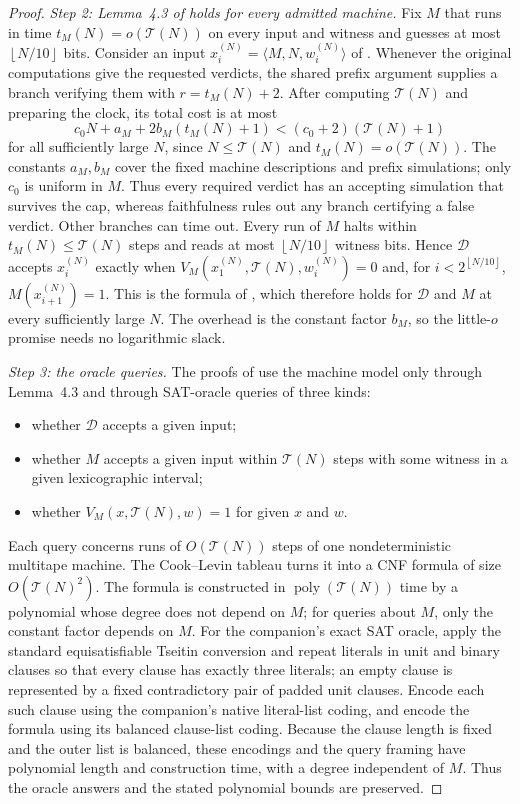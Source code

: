\documentclass[11pt,letterpaper]{article}
\theoremstyle{definition}
\theoremstyle{remark}
\newcommand{\poly}{\operatorname{poly}}
\newcommand{\floor}[1]{\left\lfloor #1\right\rfloor}
\newcommand{\Tclk}{\mathcal T}
\begin{document}
\begin{proof}
\emph{Step 2: Lemma~4.3 of \cite{CLW20} holds for every admitted machine.}
Fix \(M\) that runs in time \(t_M(N)=o(\Tclk(N))\) on every input and
witness and guesses at most \(\floor{N/10}\) bits. Consider an input
\(x^{(N)}_i=\langle M,N,w^{(N)}_i\rangle\) of \cite[Section~4.2]{CLW20}.
Whenever the original computations give the requested verdicts, the
shared prefix argument supplies a branch verifying them with
\(r=t_M(N)+2\). After computing \(\Tclk(N)\) and preparing the
clock, its total cost is at most
\[
 c_0N+a_M+2b_M(t_M(N)+1)
 <(c_0+2)(\Tclk(N)+1)
\]
for all sufficiently large \(N\), since \(N\le\Tclk(N)\) and
\(t_M(N)=o(\Tclk(N))\). The constants \(a_M,b_M\) cover the fixed
machine descriptions and prefix simulations; only \(c_0\) is uniform
in \(M\). Thus every required verdict has an accepting simulation
that survives the cap, whereas faithfulness rules out any branch
certifying a false verdict. Other branches can time out. Every
run of \(M\) halts within \(t_M(N)\le\Tclk(N)\) steps and reads at most
\(\floor{N/10}\) witness bits. Hence \(\mathcal D\) accepts
\(x^{(N)}_i\) exactly when \(V_M(x^{(N)}_1,\Tclk(N),w^{(N)}_i)=0\) and,
for \(i<2^{\floor{N/10}}\), \(M(x^{(N)}_{i+1})=1\). This is the formula
of \cite[Lemma~4.3]{CLW20}, which therefore holds for \(\mathcal D\) and
\(M\) at every sufficiently large \(N\). The overhead is the constant
factor \(b_M\), so the little-\(o\) promise needs no logarithmic slack.

\emph{Step 3: the oracle queries.} The proofs of \cite[Theorems~1.12
and~4.6]{CLW20} use the machine model only through Lemma~4.3 and through
SAT-oracle queries of three kinds:
\begin{itemize}
\item whether \(\mathcal D\) accepts a given input;
\item whether \(M\) accepts a given input within \(\Tclk(N)\) steps with
some witness in a given lexicographic interval;
\item whether \(V_M(x,\Tclk(N),w)=1\) for given \(x\) and \(w\).
\end{itemize}
Each query concerns runs of \(O(\Tclk(N))\) steps of one nondeterministic
multitape machine. The Cook--Levin tableau turns it into a CNF formula
of size \(O(\Tclk(N)^2)\). The formula is constructed in
\(\poly(\Tclk(N))\) time by a polynomial whose degree does not depend on
\(M\); for queries about \(M\), only the constant factor depends on
\(M\).
For the companion's exact SAT oracle, apply the standard equisatisfiable
Tseitin conversion and repeat literals in unit and binary clauses so
that every clause has exactly three literals; an empty clause is
represented by a fixed contradictory pair of padded unit clauses.
Encode each such clause using the companion's native literal-list
coding, and encode the formula using its balanced clause-list coding.
Because the clause length is fixed and the outer list is balanced,
these encodings and the query framing have polynomial length and
construction time, with a degree independent of \(M\). Thus the oracle
answers and the stated polynomial bounds are preserved.


\end{proof}
\end{document}
